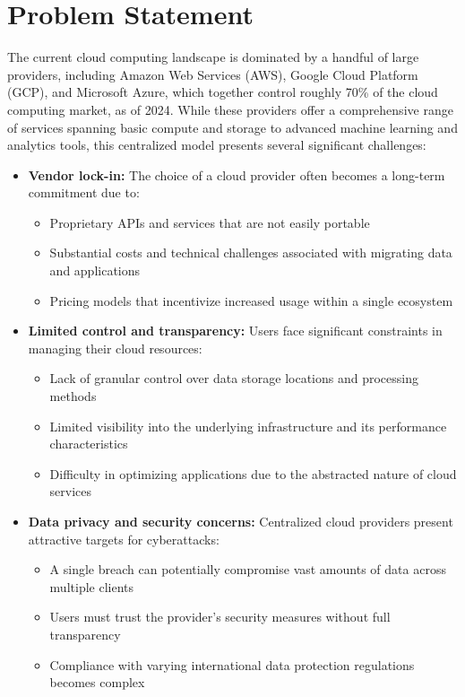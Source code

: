 \section{Problem Statement}
\label{sec:problem_statement}

The current cloud computing landscape is dominated by a handful of large providers, including Amazon Web Services (AWS), Google Cloud Platform (GCP), and Microsoft Azure, which together control roughly 70\% of the cloud computing market, as of 2024. While these providers offer a comprehensive range of services spanning basic compute and storage to advanced machine learning and analytics tools, this centralized model presents several significant challenges:

\begin{itemize}
    \item \textbf{Vendor lock-in:} The choice of a cloud provider often becomes a long-term commitment due to:
    \begin{itemize}
        \item Proprietary APIs and services that are not easily portable
        \item Substantial costs and technical challenges associated with migrating data and applications
        \item Pricing models that incentivize increased usage within a single ecosystem
    \end{itemize}

    \item \textbf{Limited control and transparency:} Users face significant constraints in managing their cloud resources:
    \begin{itemize}
        \item Lack of granular control over data storage locations and processing methods
        \item Limited visibility into the underlying infrastructure and its performance characteristics
        \item Difficulty in optimizing applications due to the abstracted nature of cloud services
    \end{itemize}

    \item \textbf{Data privacy and security concerns:} Centralized cloud providers present attractive targets for cyberattacks:
    \begin{itemize}
        \item A single breach can potentially compromise vast amounts of data across multiple clients
        \item Users must trust the provider's security measures without full transparency
        \item Compliance with varying international data protection regulations becomes complex
    \end{itemize}


\end{itemize}
